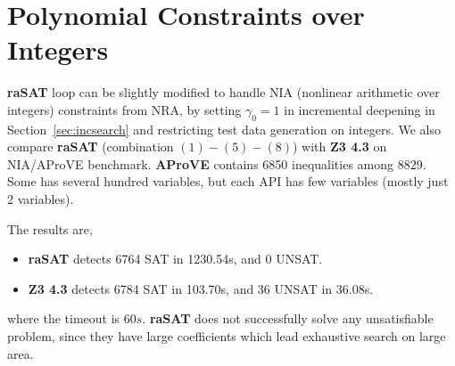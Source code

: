 \section{Polynomial Constraints over Integers} \label{sec:NIA}

{\bf raSAT} loop can be slightly modified to handle NIA (nonlinear arithmetic over integers) constraints from NRA, 
by setting $\gamma_0 = 1$ in incremental deepening in Section~\ref{sec:incsearch} 
and restricting test data generation on integers. 
We also compare {\bf raSAT} (combination ${(1)-(5)-(8)}$) with {\bf Z3 4.3} on NIA/AProVE benchmark. 
{\bf AProVE} contains 6850 inequalities among 8829. 
Some has several hundred variables, but each API has few variables (mostly just 2 variables). 

The results are, 
\begin{itemize}
\item {\bf raSAT} detects 6764 SAT in 1230.54s, and 0 UNSAT. 
\item {\bf Z3 4.3} detects 6784 SAT in 103.70s, and 36 UNSAT in 36.08s. 
\end{itemize}
where the timeout is $60s$. 
{\bf raSAT} does not successfully solve any unsatisfiable problem, since they have large coefficients
which lead exhaustive search on large area. 

